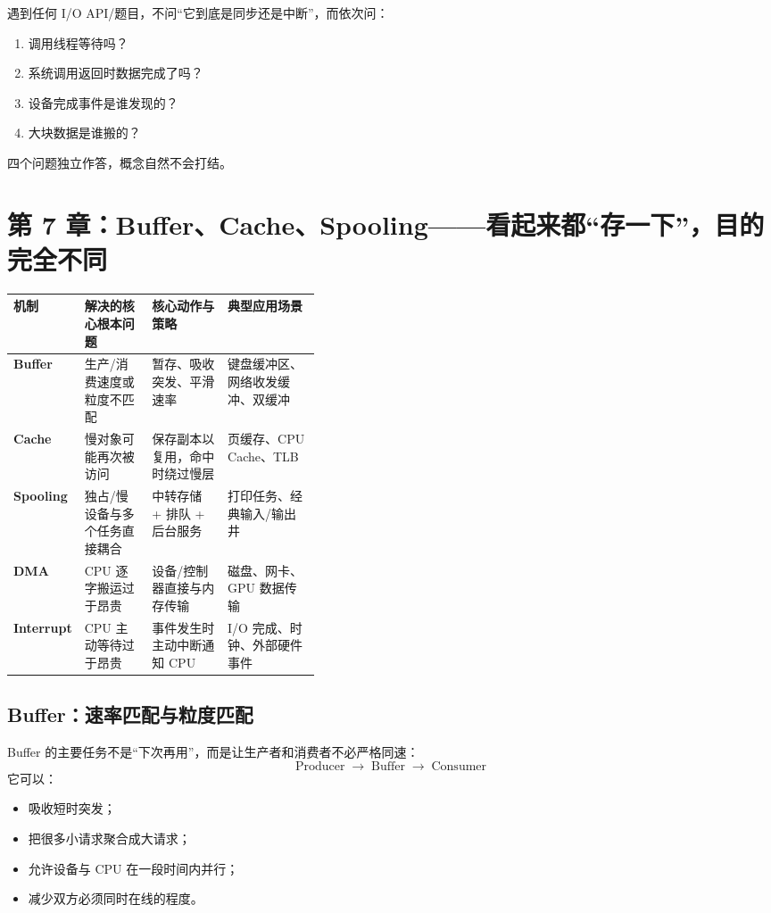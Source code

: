 \documentclass[11pt,a4paper]{ctexart}
\newcommand{\arr}{\;\longrightarrow\;}
\begin{document}
\begin{method}[四维判断法]
遇到任何 I/O API/题目，不问“它到底是同步还是中断”，而依次问：
\begin{enumerate}
  \item 调用线程等待吗？
  \item 系统调用返回时数据完成了吗？
  \item 设备完成事件是谁发现的？
  \item 大块数据是谁搬的？
\end{enumerate}
四个问题独立作答，概念自然不会打结。
\end{method}

\section{第 7 章：Buffer、Cache、Spooling——看起来都“存一下”，目的完全不同}

\begingroup
\small
\renewcommand{\arraystretch}{1.25}
\setlength{\tabcolsep}{6pt}
\begin{tabularx}{\linewidth}{>{\bfseries}p{0.18\linewidth} p{0.22\linewidth} X X}
\toprule
机制 & 解决的核心根本问题 & 核心动作与策略 & 典型应用场景 \\
\midrule
Buffer & 生产/消费速度或粒度不匹配 & 暂存、吸收突发、平滑速率 & 键盘缓冲区、网络收发缓冲、双缓冲 \\
Cache & 慢对象可能再次被访问 & 保存副本以复用，命中时绕过慢层 & 页缓存、CPU Cache、TLB \\
Spooling & 独占/慢设备与多个任务直接耦合 & 中转存储 + 排队 + 后台服务 & 打印任务、经典输入/输出井 \\
DMA & CPU 逐字搬运过于昂贵 & 设备/控制器直接与内存传输 & 磁盘、网卡、GPU 数据传输 \\
Interrupt & CPU 主动等待过于昂贵 & 事件发生时主动中断通知 CPU & I/O 完成、时钟、外部硬件事件 \\
\bottomrule
\end{tabularx}
\endgroup

\subsection{Buffer：速率匹配与粒度匹配}
Buffer 的主要任务不是“下次再用”，而是让生产者和消费者不必严格同速：
\[
\text{Producer}\arr\boxed{\text{Buffer}}\arr\text{Consumer}
\]
它可以：
\begin{itemize}
  \item 吸收短时突发；
  \item 把很多小请求聚合成大请求；
  \item 允许设备与 CPU 在一段时间内并行；
  \item 减少双方必须同时在线的程度。
\end{itemize}
\end{document}
